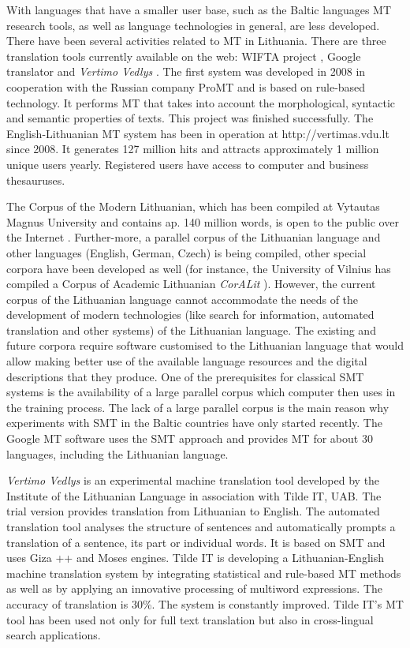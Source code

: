 \begin{multicols}{2}
    With languages that have a smaller user base, such as the Baltic languages MT research tools, as well as language technologies in general, are less developed. There have been several activities related to MT in Lithuania. There are three translation tools currently available on the web: WIFTA project \cite{vertvdu},  Google translator and \textit{Vertimo Vedlys} \cite{mvlab}.  The first system was developed in 2008 in cooperation with the Russian company ProMT and is based on rule-based technology. It performs MT that takes into account the morphological, syntactic and semantic properties of texts. This project was finished successfully. The English-Lithuanian MT system has been in operation at http://vertimas.vdu.lt since 2008. It generates 127 million hits and attracts approximately 1 million unique users yearly. Registered users have access to computer and business thesauruses.

    The Corpus of the Modern Lithuanian, which has been compiled at Vytautas Magnus University and contains ap. 140 million words, is open to the public over the Internet \cite{tekstynas}.  Further-more, a parallel corpus of the Lithuanian language and other languages (English, German, Czech) is being compiled, other special corpora have been developed as well (for instance, the University of Vilnius has compiled a Corpus of Academic Lithuanian \textit{CorALit} \cite{coralit}). However, the current corpus of the Lithuanian language cannot accommodate the needs of the development of modern technologies (like search for information, automated translation and other systems) of the Lithuanian language. The existing and future corpora require software customised to the Lithuanian language that would allow making better use of the available language resources and the digital descriptions that they produce. One of the prerequisites for classical SMT systems is the  availability of a large parallel corpus which computer then uses in the training process. The lack of a large parallel corpus is the main reason why experiments with SMT in the Baltic countries have only started recently.  
    The Google MT software uses the SMT approach and provides MT for about 30 languages, including the Lithuanian language.

\textit{Vertimo Vedlys} is an experimental machine translation tool developed by the Institute of the Lithuanian Language in association with Tilde IT, UAB. The trial version provides translation from Lithuanian to English. The automated translation tool analyses the structure of sentences and automatically prompts a translation of a sentence, its part or individual words. It is based on SMT and uses Giza ++ and Moses engines. Tilde IT is developing a Lithuanian-English machine translation system by integrating statistical and rule-based MT methods as well as by applying an innovative processing of multiword expressions. The accuracy of translation is 30\%. The system is constantly improved. Tilde IT's MT tool has been used not only for full text translation but also in cross-lingual search applications.


\end{multicols}
